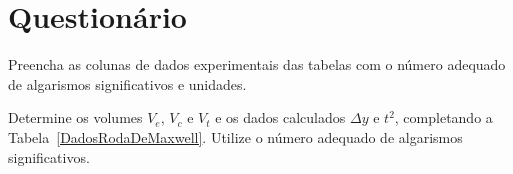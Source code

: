 \cleardoublepage


\vspace{15mm}

\begin{fullwidth}
\noindent{}
\vspace{5mm}

\noindent{}

\noindent{}

\noindent{}

\noindent{}

\noindent{}
\end{fullwidth}

\vspace{5mm}

\section{Questionário}

\begin{question}[type={exam}]{2}
Preencha as colunas de dados experimentais das tabelas com o número adequado de algarismos significativos e unidades.
\end{question}

\begin{question}[type={exam}]{2}
Determine os volumes $V_e$, $V_c$ e $V_t$ e os dados calculados $\Delta y$ e $t^2$, completando a Tabela~\ref{DadosRodaDeMaxwell}. Utilize o número adequado de algarismos significativos.
\end{question}

